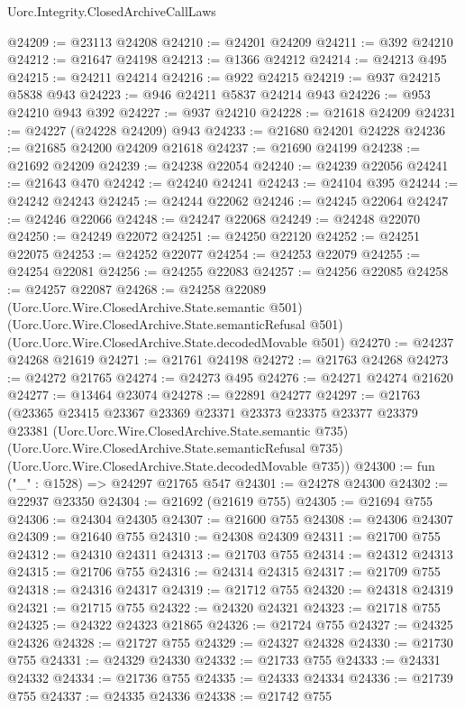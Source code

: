 \begin{lexlean}{Uorc.Integrity.ClosedArchiveCallLaws}
\begin{coremodule}
@24209 := @23113 @24208
@24210 := @24201 @24209
@24211 := @392 @24210
@24212 := @21647 @24198
@24213 := @1366 @24212
@24214 := @24213 @495
@24215 := @24211 @24214
@24216 := @922 @24215
@24219 := @937 @24215 @5838 @943
@24223 := @946 @24211 @5837 @24214 @943
@24226 := @953 @24210 @943 @392
@24227 := @937 @24210
@24228 := @21618 @24209
@24231 := @24227 (@24228 @24209) @943
@24233 := @21680 @24201 @24228
@24236 := @21685 @24200 @24209 @21618
@24237 := @21690 @24199
@24238 := @21692 @24209
@24239 := @24238 @22054
@24240 := @24239 @22056
@24241 := @21643 @470
@24242 := @24240 @24241
@24243 := @24104 @395
@24244 := @24242 @24243
@24245 := @24244 @22062
@24246 := @24245 @22064
@24247 := @24246 @22066
@24248 := @24247 @22068
@24249 := @24248 @22070
@24250 := @24249 @22072
@24251 := @24250 @22120
@24252 := @24251 @22075
@24253 := @24252 @22077
@24254 := @24253 @22079
@24255 := @24254 @22081
@24256 := @24255 @22083
@24257 := @24256 @22085
@24258 := @24257 @22087
@24268 := @24258
    @22089
    (Uorc.Uorc.Wire.ClosedArchive.State.semantic @501)
    (Uorc.Uorc.Wire.ClosedArchive.State.semanticRefusal @501)
    (Uorc.Uorc.Wire.ClosedArchive.State.decodedMovable @501)
@24270 := @24237 @24268 @21619
@24271 := @21761 @24198
@24272 := @21763 @24268
@24273 := @24272 @21765
@24274 := @24273 @495
@24276 := @24271 @24274 @21620
@24277 := @13464 @23074
@24278 := @22891 @24277
@24297 := @21763
    (@23365
      @23415
      @23367
      @23369
      @23371
      @23373
      @23375
      @23377
      @23379
      @23381
      (Uorc.Uorc.Wire.ClosedArchive.State.semantic @735)
      (Uorc.Uorc.Wire.ClosedArchive.State.semanticRefusal @735)
      (Uorc.Uorc.Wire.ClosedArchive.State.decodedMovable @735))
@24300 := fun ("_" : @1528) => @24297 @21765 @547
@24301 := @24278 @24300
@24302 := @22937 @23350
@24304 := @21692 (@21619 @755)
@24305 := @21694 @755
@24306 := @24304 @24305
@24307 := @21600 @755
@24308 := @24306 @24307
@24309 := @21640 @755
@24310 := @24308 @24309
@24311 := @21700 @755
@24312 := @24310 @24311
@24313 := @21703 @755
@24314 := @24312 @24313
@24315 := @21706 @755
@24316 := @24314 @24315
@24317 := @21709 @755
@24318 := @24316 @24317
@24319 := @21712 @755
@24320 := @24318 @24319
@24321 := @21715 @755
@24322 := @24320 @24321
@24323 := @21718 @755
@24325 := @24322 @24323 @21865
@24326 := @21724 @755
@24327 := @24325 @24326
@24328 := @21727 @755
@24329 := @24327 @24328
@24330 := @21730 @755
@24331 := @24329 @24330
@24332 := @21733 @755
@24333 := @24331 @24332
@24334 := @21736 @755
@24335 := @24333 @24334
@24336 := @21739 @755
@24337 := @24335 @24336
@24338 := @21742 @755

\end{coremodule}
\end{lexlean}

